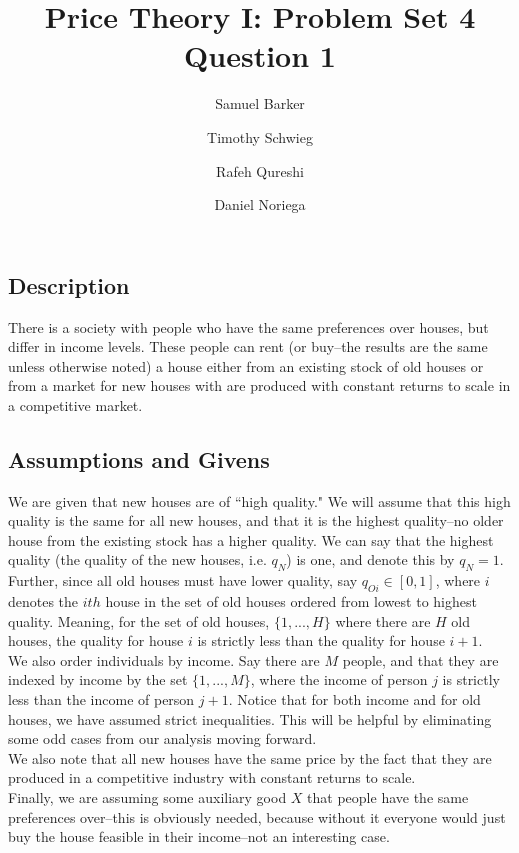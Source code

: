 \documentclass[12pt]{paper}
\title{Price Theory I: Problem Set 4 Question 1}
\author{Samuel Barker\and Timothy Schwieg\and Rafeh Qureshi\and Daniel Noriega}
\begin{document}
\maketitle

\subsection*{Description}


There is a society with people who have the same preferences over houses, but differ in income levels. These people can rent (or buy--the results are the same unless otherwise noted) a house either from an existing stock of old houses or from a market for new houses with are produced with constant returns to scale in a competitive market.


\subsection*{Assumptions and Givens}


We are given that new houses are of ``high quality." We will assume that this high quality is the same for all new houses, and that it is the highest quality--no older house from the existing stock has a higher quality. We can say that the highest quality (the quality of the new houses, i.e. $q_N$) is one, and denote this by $q_N=1$. Further, since all old houses must have lower quality, say $q_{Oi} \in [0,1]$, where $i$ denotes the $ith$ house in the set of old houses ordered from lowest to highest quality. Meaning, for the set of old houses, $\{1,...,H\}$ where there are $H$ old houses, the quality for house $i$ is strictly less than the quality for house $i+1$.\\


We also order individuals by income. Say there are $M$ people, and that they are indexed by income by the set $\{1,...,M\}$, where the income of person $j$ is strictly less than the income of person $j+1$. Notice that for both income and for old houses, we have assumed strict inequalities. This will be helpful by eliminating some odd cases from our analysis moving forward.\\


We also note that all new houses have the same price by the fact that they are produced in a competitive industry with constant returns to scale.\\


Finally, we are assuming some auxiliary good $X$ that people have the same preferences over--this is obviously needed, because without it everyone would just buy the house feasible in their income--not an interesting case.\\
\end{document}
